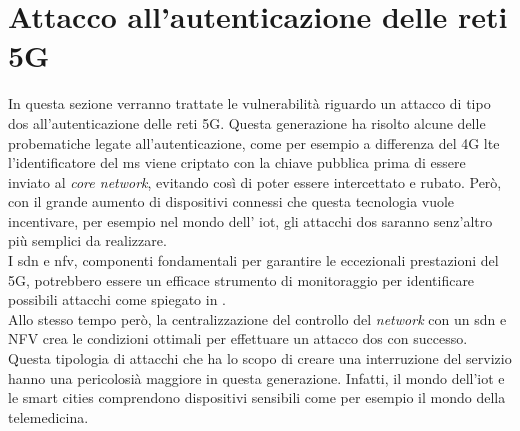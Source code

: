 \chapter{Attacco all'autenticazione delle reti 5G}
In questa sezione verranno trattate le vulnerabilità riguardo un attacco di tipo \gls{dos} all'autenticazione delle reti 5G.
Questa generazione ha risolto alcune delle probematiche legate all'autenticazione, come per esempio a differenza del 4G \gls{lte} l'identificatore 
del \gls{ms} viene criptato con la chiave pubblica prima di essere inviato al \textit{core network}, evitando così di poter essere intercettato e rubato\cite{5g-vs-4g}.
Però, con il grande aumento di dispositivi connessi che questa tecnologia vuole incentivare, per esempio nel mondo dell' \gls{iot}, gli attacchi \gls{dos} saranno senz'altro più 
semplici da realizzare.\\
I \gls{sdn} e \gls{nfv}, componenti fondamentali per garantire le eccezionali prestazioni del 5G, potrebbero essere un efficace strumento di monitoraggio per identificare possibili 
attacchi come spiegato in \cite{dos-detection-with-sdn}.\\
Allo stesso tempo però, la centralizzazione del controllo del \textit{network} con un \gls{sdn} e NFV crea le condizioni ottimali per effettuare un attacco \gls{dos} con successo\cite{5g-dos}.\\
Questa tipologia di attacchi che ha lo scopo di creare una interruzione del servizio hanno una pericolosià maggiore in questa generazione. Infatti, il mondo dell'\gls{iot} e le smart cities comprendono 
dispositivi sensibili come per esempio il mondo della telemedicina.

\clearpage

